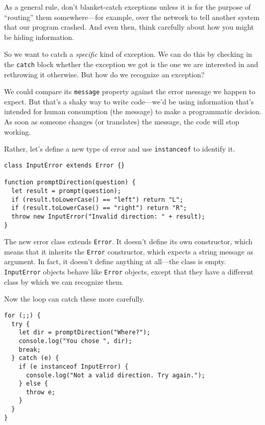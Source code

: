As a general rule, don't blanket-catch exceptions unless it is for the purpose of ``routing'' them somewhere—for example, over the network to tell another system that our program crashed. And even then, think carefully about how you might be hiding information.

So we want to catch a \emph{specific} kind of exception. We can do this by checking in the \lstinline`catch` block whether the exception we got is the one we are interested in and rethrowing it otherwise. But how do we recognize an exception?

We could compare its \lstinline`message` property against the error message we happen to expect. But that's a shaky way to write code—we'd be using information that's intended for human consumption (the message) to make a programmatic decision. As soon as someone changes (or translates) the message, the code will stop working.

Rather, let's define a new type of error and use \lstinline`instanceof` to identify it.

\begin{lstlisting}
class InputError extends Error {}

function promptDirection(question) {
  let result = prompt(question);
  if (result.toLowerCase() == "left") return "L";
  if (result.toLowerCase() == "right") return "R";
  throw new InputError("Invalid direction: " + result);
}
\end{lstlisting}
\noindent{}

The new error class extends \lstinline`Error`. It doesn't define its own constructor, which means that it inherits the \lstinline`Error` constructor, which expects a string message as argument. In fact, it doesn't define anything at all—the class is empty. \lstinline`InputError` objects behave like \lstinline`Error` objects, except that they have a different class by which we can recognize them.

Now the loop can catch these more carefully.

\begin{lstlisting}
for (;;) {
  try {
    let dir = promptDirection("Where?");
    console.log("You chose ", dir);
    break;
  } catch (e) {
    if (e instanceof InputError) {
      console.log("Not a valid direction. Try again.");
    } else {
      throw e;
    }
  }
}
\end{lstlisting}
\noindent{}

